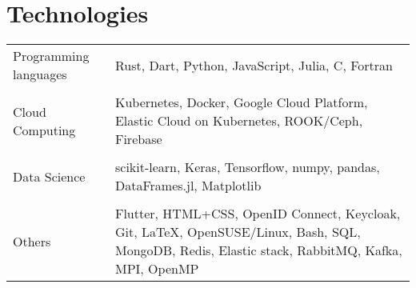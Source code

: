 \documentclass[10pt]{article}
\begin{document}
\section*{Technologies}

\begin{tabu} to \linewidth {lX}
Programming languages
& Rust, Dart, Python, JavaScript, Julia, C, Fortran \\
&\\
Cloud Computing
& Kubernetes, Docker, Google Cloud Platform, Elastic Cloud on
  Kubernetes, ROOK/Ceph, Firebase \\
&\\
Data Science
& scikit-learn, Keras, Tensorflow, numpy, pandas, DataFrames.jl,
  Matplotlib \\
&\\
Others
& Flutter, HTML+CSS, OpenID Connect, Keycloak, Git, {\LaTeX},
  OpenSUSE/Linux, Bash, SQL, MongoDB, Redis, Elastic stack, RabbitMQ,
  Kafka, MPI, OpenMP \\
\end{tabu}
\end{document}
